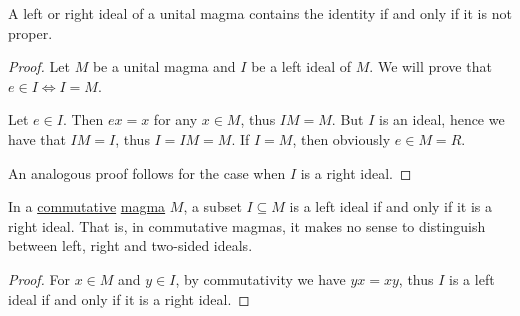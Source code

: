 \begin{Proposition}\label{thm:proper_ideals_containing_identity}
  A left or right ideal of a unital magma contains the identity if and only if it is not proper.
\end{Proposition}
\begin{proof}
  Let \( M \) be a unital magma and \( I \) be a left ideal of \( M \). We will prove that \( e \in I \iff I = M \).

  \begin{RefList}
    \ISufficiency Let \( e \in I \). Then \( ex = x \) for any \( x \in M \), thus \( IM = M \). But \( I \) is an ideal, hence we have that \( IM = I \), thus \( I = IM = M \).
    \INecessity If \( I = M \), then obviously \( e \in M = R \).
  \end{RefList}

  An analogous proof follows for the case when \( I \) is a right ideal.
\end{proof}

\begin{Proposition}\label{thm:commutative_magma_ideals}
  In a \hyperref[def:algebraic_theory/commutativity]{commutative} \hyperref[def:magma/magma]{magma} \( M \), a subset \( I \subseteq M \) is a left ideal if and only if it is a right ideal. That is, in commutative magmas, it makes no sense to distinguish between left, right and two-sided ideals.
\end{Proposition}
\begin{proof}
  For \( x \in M \) and \( y \in I \), by commutativity we have \( yx = xy \), thus \( I \) is a left ideal if and only if it is a right ideal.
\end{proof}

